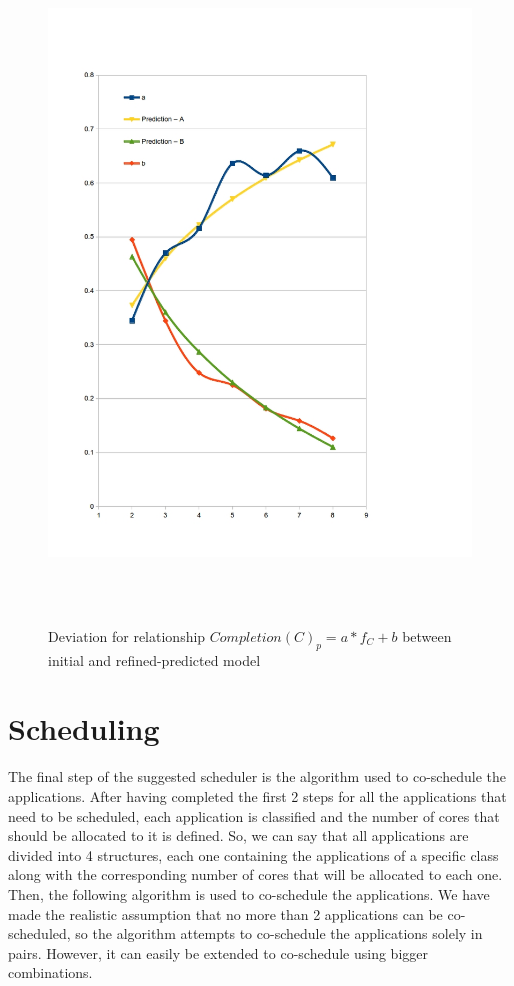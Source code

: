 \documentclass[diploma]{Styles/softlab-thesis}
\begin{document}
\begin{figure}[ht!]
\begin{center}
\includegraphics[width=160mm, height=180mm]{images/refined-prediction-C.jpg}
\caption{Deviation for relationship $Completion(C)_{p}=a*f_{C}+b$ between initial and refined-predicted model  \label{overflow}}
\end{center}
\end{figure}

\chapter{Scheduling}

The final step of the suggested scheduler is the algorithm used to co-schedule the applications. After having completed the first 2 steps for all the applications that need to be scheduled, each application is classified and the number of cores that should be allocated to it is defined. So, we can say that all applications are divided into 4 structures, each one containing the applications of a specific class along with the corresponding number of cores that will be allocated to each one. Then, the following algorithm is used to co-schedule the applications. We have made the realistic assumption that no more than 2 applications can be co-scheduled, so the algorithm attempts to co-schedule the applications solely in pairs. However, it can easily be extended to co-schedule using bigger combinations. \\
\end{document}
